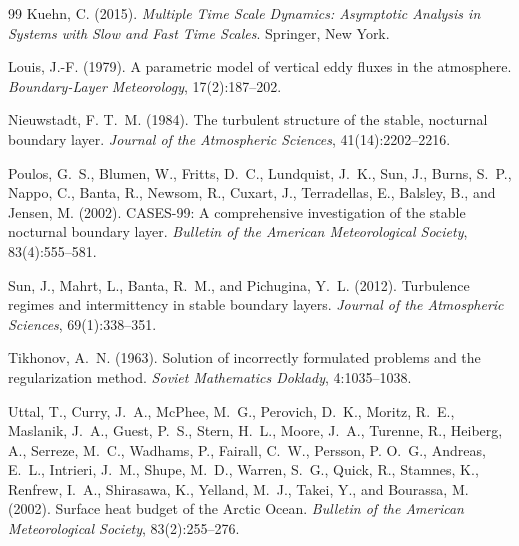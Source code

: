 \documentclass[11pt,a4paper]{article}
\begin{document}
\begin{thebibliography}{99}
Kuehn, C. (2015).
\newblock \emph{Multiple Time Scale Dynamics: Asymptotic Analysis in Systems with Slow and Fast Time Scales}.
\newblock Springer, New York.

Louis, J.-F. (1979).
\newblock A parametric model of vertical eddy fluxes in the atmosphere.
\newblock \emph{Boundary-Layer Meteorology}, 17(2):187--202.

Nieuwstadt, F. T.~M. (1984).
\newblock The turbulent structure of the stable, nocturnal boundary layer.
\newblock \emph{Journal of the Atmospheric Sciences}, 41(14):2202--2216.

Poulos, G.~S., Blumen, W., Fritts, D.~C., Lundquist, J.~K., Sun, J., Burns, S.~P., Nappo, C., Banta, R., Newsom, R., Cuxart, J., Terradellas, E., Balsley, B., and Jensen, M. (2002).
\newblock CASES-99: A comprehensive investigation of the stable nocturnal boundary layer.
\newblock \emph{Bulletin of the American Meteorological Society}, 83(4):555--581.

Sun, J., Mahrt, L., Banta, R.~M., and Pichugina, Y.~L. (2012).
\newblock Turbulence regimes and intermittency in stable boundary layers.
\newblock \emph{Journal of the Atmospheric Sciences}, 69(1):338--351.

Tikhonov, A.~N. (1963).
\newblock Solution of incorrectly formulated problems and the regularization method.
\newblock \emph{Soviet Mathematics Doklady}, 4:1035--1038.

Uttal, T., Curry, J.~A., McPhee, M.~G., Perovich, D.~K., Moritz, R.~E., Maslanik, J.~A., Guest, P.~S., Stern, H.~L., Moore, J.~A., Turenne, R., Heiberg, A., Serreze, M.~C., Wadhams, P., Fairall, C.~W., Persson, P. O.~G., Andreas, E.~L., Intrieri, J.~M., Shupe, M.~D., Warren, S.~G., Quick, R., Stamnes, K., Renfrew, I.~A., Shirasawa, K., Yelland, M.~J., Takei, Y., and Bourassa, M. (2002).
\newblock Surface heat budget of the Arctic Ocean.
\newblock \emph{Bulletin of the American Meteorological Society}, 83(2):255--276.

\end{thebibliography}
\end{document}
